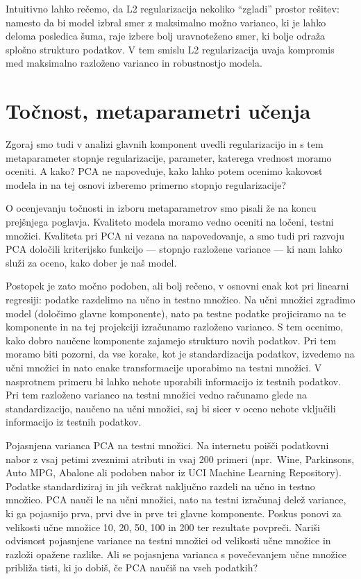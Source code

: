 Intuitivno lahko rečemo, da L2 regularizacija nekoliko ``zgladi'' prostor rešitev: namesto da bi model izbral smer z maksimalno možno varianco, ki je lahko deloma posledica šuma, raje izbere bolj uravnoteženo smer, ki bolje odraža splošno strukturo podatkov. V tem smislu L2 regularizacija uvaja kompromis med maksimalno razloženo varianco in robustnostjo modela.


\section{Točnost, metaparametri učenja}

Zgoraj smo tudi v analizi glavnih komponent uvedli regularizacijo in s tem metaparameter stopnje regularizacije, parameter, katerega vrednost moramo oceniti. A kako? PCA ne napoveduje, kako lahko potem ocenimo kakovost modela in na tej osnovi izberemo primerno stopnjo regularizacije?

O ocenjevanju točnosti in izboru metaparametrov smo pisali že na koncu prejšnjega poglavja. Kvaliteto modela moramo vedno oceniti na ločeni, testni množici. Kvaliteta pri PCA ni vezana na napovedovanje, a smo tudi pri razvoju PCA določili kriterijsko funkcijo — stopnjo razložene variance — ki nam lahko služi za oceno, kako dober je naš model.

Postopek je zato močno podoben, ali bolj rečeno, v osnovni enak kot pri linearni regresiji: podatke razdelimo na učno in testno množico. Na učni množici zgradimo model (določimo glavne komponente), nato pa testne podatke projiciramo na te komponente in na tej projekciji izračunamo razloženo varianco. S tem ocenimo, kako dobro naučene komponente zajamejo strukturo novih podatkov. Pri tem moramo biti pozorni, da vse korake, kot je standardizacija podatkov, izvedemo na učni množici in nato enake transformacije uporabimo na testni množici. V nasprotnem primeru bi lahko nehote uporabili informacijo iz testnih podatkov. Pri tem razloženo varianco na testni množici vedno računamo glede na standardizacijo, naučeno na učni množici, saj bi sicer v oceno nehote vključili informacijo iz testnih podatkov.

\begin{exercise}{Pojasnjena varianca PCA na testni množici.}
Na internetu poišči podatkovni nabor z vsaj petimi zveznimi atributi in vsaj 200 primeri (npr.\ Wine, Parkinsons, Auto MPG, Abalone ali podoben nabor iz UCI Machine Learning Repository). Podatke standardiziraj in jih večkrat naključno razdeli na učno in testno množico. PCA nauči le na učni množici, nato na testni izračunaj delež variance, ki ga pojasnijo prva, prvi dve in prve tri glavne komponente. Poskus ponovi za velikosti učne množice 10, 20, 50, 100 in 200 ter rezultate povpreči. Nariši odvisnost pojasnjene variance na testni množici od velikosti učne množice in razloži opažene razlike. Ali se pojasnjena varianca s povečevanjem učne množice približa tisti, ki jo dobiš, če PCA naučiš na vseh podatkih?
\end{exercise}

